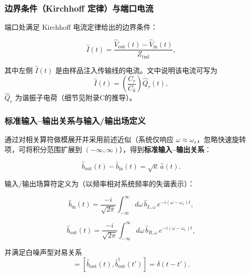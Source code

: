 \documentclass[12pt,a4paper,oneside]{ctexbook}
\begin{document}
\subsubsection{边界条件（Kirchhoff 定律）与端口电流}

端口处满足 Kirchhoff 电流定律给出的边界条件：

\begin{equation}
\hat I(t)=\frac{\hat V_{\mathrm{out}}(t)-\hat V_{\mathrm{in}}(t)}{Z_{\mathrm{tml}}},
\tag{71}
\end{equation}

其中左侧 $\hat I(t)$ 是由样品注入传输线的电流。文中说明该电流可写为
\begin{equation}
\hat I(t)=\left(\frac{C_r}{C_k}\right)\dot{\hat Q}_r(t),
\end{equation}
$\hat Q_r$ 为谐振子电荷（细节见附录C的推导）。

\subsubsection{标准输入--输出关系与输入/输出场定义}

通过对相关算符做模展开并采用前述近似（系统仅响应 $\omega\approx\omega_r$，忽略快速旋转项，可将积分范围扩展到 $(-\infty,\infty)$），得到\textbf{标准输入--输出关系}：

\begin{equation}
\hat b_{\mathrm{out}}(t)-\hat b_{\mathrm{in}}(t)=\sqrt{\kappa}\,\hat a(t).
\tag{72}
\end{equation}

输入/输出场算符定义为（以频率相对系统频率的失谐表示）：

\begin{equation}
\hat b_{\mathrm{in}}(t)=
\frac{-i}{\sqrt{2\pi}}\int_{-\infty}^{\infty} d\omega\,\hat b_{L,\omega}\,e^{-i(\omega-\omega_r)t},
\tag{73}
\end{equation}

\begin{equation}
\hat b_{\mathrm{out}}(t)=
\frac{-i}{\sqrt{2\pi}}\int_{-\infty}^{\infty} d\omega\,\hat b_{R,\omega}\,e^{-i(\omega-\omega_r)t},
\tag{74}
\end{equation}

并满足白噪声型对易关系
\begin{equation}
[\hat b_{\mathrm{in}}(t),\hat b_{\mathrm{in}}^\dagger(t')]=
[\hat b_{\mathrm{out}}(t),\hat b_{\mathrm{out}}^\dagger(t')]=\delta(t-t').
\end{equation}
\end{document}
